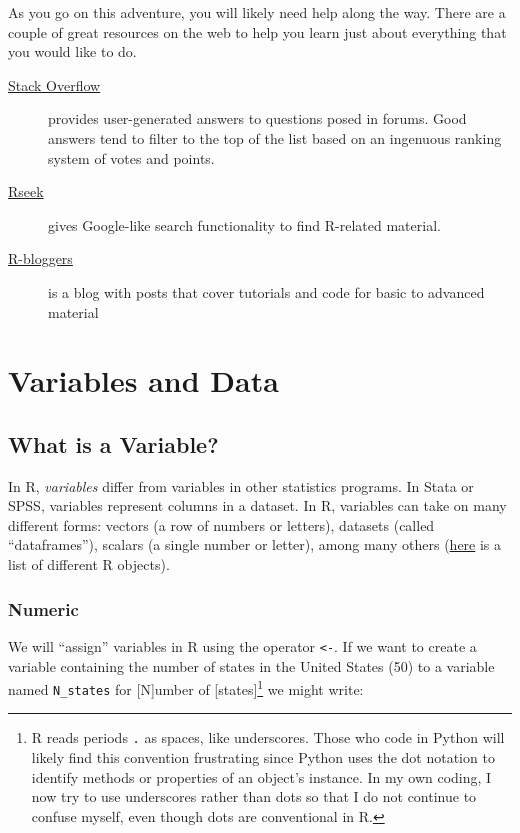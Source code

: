 \documentclass[]{article}
\let\rmarkdownfootnote\footnote%
\def\footnote{\protect\rmarkdownfootnote}
\begin{document}
As you go on this adventure, you will likely need help along the way.
There are a couple of great resources on the web to help you learn just
about everything that you would like to do.

\begin{description}
\item[\href{https://stackoverflow.com/questions/tagged/r}{Stack
Overflow}]
provides user-generated answers to questions posed in forums. Good
answers tend to filter to the top of the list based on an ingenuous
ranking system of votes and points.
\item[\href{https://rseek.org/}{Rseek}]
gives Google-like search functionality to find R-related material.
\item[\href{https://www.r-bloggers.com/}{R-bloggers}]
is a blog with posts that cover tutorials and code for basic to advanced
material
\end{description}

\section{Variables and Data}\label{variables-and-data}

\subsection{What is a Variable?}\label{what-is-a-variable}

In R, \emph{variables} differ from variables in other statistics
programs. In Stata or SPSS, variables represent columns in a dataset. In
R, variables can take on many different forms: vectors (a row of numbers
or letters), datasets (called ``dataframes''), scalars (a single number
or letter), among many others
(\href{https://www.statmethods.net/input/datatypes.html}{here} is a list
of different R objects).

\hypertarget{vars_numeric}{\subsubsection{Numeric}\label{vars_numeric}}

We will ``assign'' variables in R using the operator
\texttt{\textless{}-}. If we want to create a variable containing the
number of states in the United States (50) to a variable named
\texttt{N\_states} for {[}N{]}umber of {[}states{]}\footnote{R reads
  periods \texttt{.} as spaces, like underscores. Those who code in
  Python will likely find this convention frustrating since Python uses
  the dot notation to identify methods or properties of an object's
  instance. In my own coding, I now try to use underscores rather than
  dots so that I do not continue to confuse myself, even though dots are
  conventional in R.} we might write:
\end{document}
